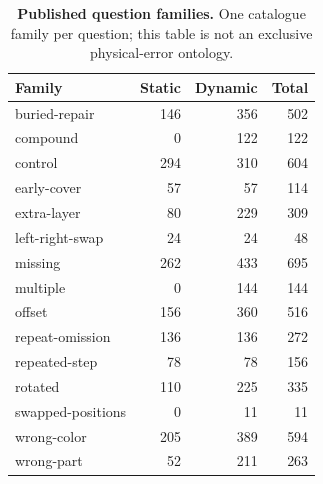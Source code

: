 \begin{table}[t]
\centering\small
\caption{\textbf{Published question families.} One catalogue family per question; this table is not an exclusive physical-error ontology.}
\label{tab:families}
\begin{tabularx}{\textwidth}{@{}Xrrr@{}}\toprule
Family & Static & Dynamic & Total\\\midrule
buried-repair & 146 & 356 & 502\\
compound & 0 & 122 & 122\\
control & 294 & 310 & 604\\
early-cover & 57 & 57 & 114\\
extra-layer & 80 & 229 & 309\\
left-right-swap & 24 & 24 & 48\\
missing & 262 & 433 & 695\\
multiple & 0 & 144 & 144\\
offset & 156 & 360 & 516\\
repeat-omission & 136 & 136 & 272\\
repeated-step & 78 & 78 & 156\\
rotated & 110 & 225 & 335\\
swapped-positions & 0 & 11 & 11\\
wrong-color & 205 & 389 & 594\\
wrong-part & 52 & 211 & 263\\
\bottomrule
\end{tabularx}
\end{table}
